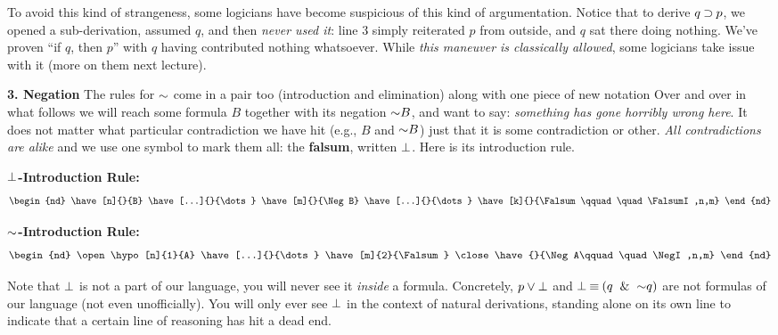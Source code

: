 \documentclass[options]{philosophersimprint}
\begin{document}
To avoid this kind of strangeness, some logicians have become suspicious of this kind of argumentation. Notice that to derive $q \mathbin{\supset} p$, we opened a sub-derivation, assumed $q$, and then \textit{never used it}: line 3 simply reiterated $p$ from outside, and $q$ sat there doing nothing. We've proven ``if $q$, then $p$'' with $q$ having contributed nothing whatsoever. While \textit{this maneuver is classically allowed}, some logicians take issue with it (more on them next lecture).

\textbf{3. Negation} The rules for $\mathord{\sim}$ come in a pair too (introduction and elimination) along with one piece of new notation Over and over in what follows we will reach some formula $B$ together with its negation $\mathord{\sim} B$, and want to say: \textit{something has gone horribly wrong here}. It does not matter what particular contradiction we have hit (e.g., $B$ and $\mathord{\sim} B$) just that it is some contradiction or other. \textit{All contradictions are alike} and we use one symbol to mark them all: the \textbf{falsum}, written $\bot$. Here is its introduction rule.
\begin{center}
\begin{minipage}[t]{0.2\textwidth}
\textbf{$\bot$-Introduction Rule:}
\vspace{-0.25cm}
\begin{align*}
\begin{nd}
\have[n]{}{B}
\have[...]{}{\dots}
\have[m]{}{\Neg B}
\have[...]{}{\dots}
\have[k]{}{\Falsum\qquad\quad\FalsumI,n,m}
\end{nd}
\end{align*}
\end{minipage}
\hfill
\begin{minipage}[t]{0.2\textwidth}
\textbf{$\mathord{\sim}$-Introduction Rule:}
\vspace{-0.25cm}
\begin{align*}
\begin{nd}
\open
\hypo[n]{1}{A}
\have[...]{}{\dots}
\have[m]{2}{\Falsum}
\close
\have{}{\Neg A\qquad\quad\NegI,n,m}
\end{nd}
\end{align*}
\end{minipage}
\end{center}
\vspace{-0.5cm}
Note that $\bot$ is not a part of our language, you will never see it \textit{inside} a formula. Concretely, $p\mathbin{\vee}\bot$ and $\bot\mathbin{\equiv}(q\ \mathbin{\&} \ \mathord{\sim} q)$ are not formulas of our language (not even unofficially). You will only ever see $\bot$ in the context of natural derivations, standing alone on its own line to indicate that a certain line of reasoning has hit a dead end.
\end{document}
